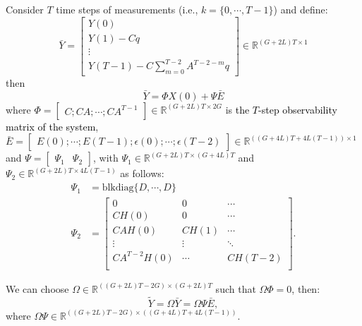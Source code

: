\noindent
Consider $T$ time steps of measurements (i.e., $k = \{0, \cdots, T-1 \}$) and define:
\begin{equation}
\bar Y = \begin{bmatrix} Y (0)  \\ Y (1) - C q  \\ \vdots \\ Y(T-1) - C \sum_{m=0}^{T-2}A^{T-2-m} q \end{bmatrix} \in \mathbb{R}^{(G+2L)T \times 1}
\end{equation}
then
\begin{equation}\label{eq:Ebar_Psi}
\bar Y = \Phi X(0) + \Psi  \bar E
\end{equation}
where $\Phi = \begin{bmatrix} C; CA ; \cdots ; CA^{T-1} \end{bmatrix} \in \mathbb{R}^{(G+2L)T \times 2G}$ is \textcolor{black}{the $T$-step observability matrix of the system}, $\bar E = \begin{bmatrix} E(0); \cdots; E(T-1); \epsilon(0); \cdots; \epsilon(T-2) \end{bmatrix} \in \mathbb{R}^{((G+4L)T + 4L(T-1)) \times 1} $ and $\Psi = \begin{bmatrix} \Psi_{1} & \Psi_{2} \end{bmatrix}$, with $\Psi_{1} \in \mathbb{R}^{(G+2L)T \times (G+4L)T}$ and $\Psi_{2}\in \mathbb{R}^{(G+2L)T \times 4L(T-1)}$ as follows:
\begin{equation}
\begin{aligned}
\Psi_{1} &= \text{blkdiag} \{ D, \cdots, D \} \\
\Psi_{2} &= \begin{bmatrix}   0 &  0  &  \cdots    	\\
   			        C H(0) & 0 &  \cdots  	\\
			       CAH(0) &  CH(1) & \cdots	\\
			        \vdots & \vdots  &  \ddots \\
			       CA^{T-2}H(0) & \cdots & CH(T-2) \\			
			    \end{bmatrix}	.
\end{aligned}\nonumber
\end{equation}

\noindent
We can choose $\Omega \in \mathbb{R}^{ ((G+2L)T - 2G)\times (G+2L)T}$ such that $\Omega \Phi = 0$, then:
\begin{equation}\label{eq:Ebar_OmegaPsi}
	\tilde Y = \Omega \bar Y = \Omega \Psi \bar E,
\end{equation}
where $\Omega \Psi \in \mathbb{R}^{((G+2L)T - 2G) \times ((G+4L)T + 4L(T-1))}$.

